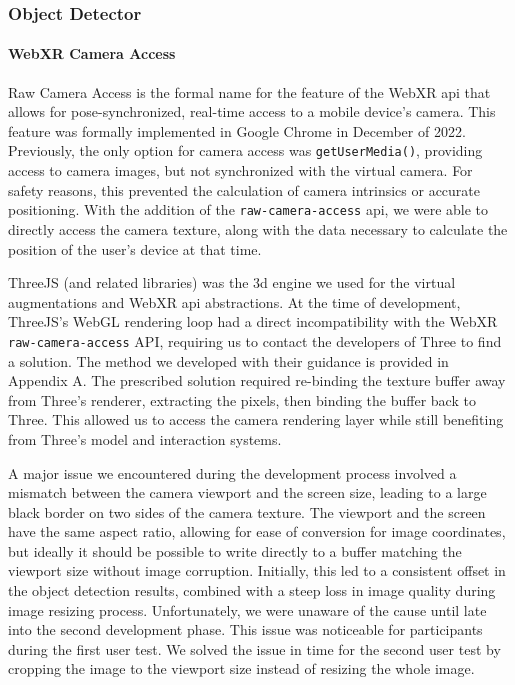 \documentclass[thesis]{fputhesis}
\begin{document}
\begin{body}
\subsubsection{Object Detector}
\paragraph{WebXR Camera Access}
Raw Camera Access is the formal name for the feature of the WebXR \acrshort{api} that allows for pose-synchronized, real-time access to a mobile device's camera. This feature was formally implemented in Google Chrome in December of 2022. Previously, the only option for camera access was \verb|getUserMedia()|, providing access to camera images, but not synchronized with the virtual camera. For safety reasons, this prevented the calculation of camera intrinsics or accurate positioning. With the addition of the \verb|raw-camera-access| \acrshort{api}, we were able to directly access the camera texture, along with the data necessary to calculate the position of the user's device at that time. 

ThreeJS (and related libraries) was the 3d engine we used for the virtual augmentations and WebXR \acrshort{api} abstractions. At the time of development, ThreeJS's WebGL rendering loop had a direct incompatibility with the WebXR \verb|raw-camera-access| API, requiring us to contact the developers of Three to find a solution. The method we developed with their guidance is provided in Appendix A. The prescribed solution required re-binding the texture buffer away from Three's renderer, extracting the pixels, then binding the buffer back to Three. This allowed us to access the camera rendering layer while still benefiting from Three's model and interaction systems. 

A major issue we encountered during the development process involved a mismatch between the camera viewport and the screen size, leading to a large black border on two sides of the camera texture. The viewport and the screen have the same aspect ratio, allowing for ease of conversion for image coordinates, but ideally it should be possible to write directly to a buffer matching the viewport size without image corruption. Initially, this led to a consistent offset in the object detection results, combined with a steep loss in image quality during image resizing process. Unfortunately, we were unaware of the cause until late into the second development phase. This issue was noticeable for participants during the first user test.  We solved the issue in time for the second user test by cropping the image to the viewport size instead of resizing the whole image.


\end{body}
\end{document}
